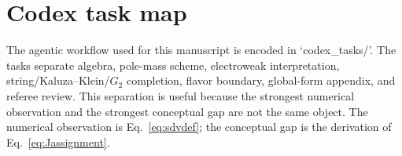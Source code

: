 \section{Codex task map}
\label{app:codex-map}

The agentic workflow used for this manuscript is encoded in `codex\_tasks/'.  The tasks separate algebra, pole-mass scheme, electroweak interpretation, string/Kaluza--Klein/\(G_2\) completion, flavor boundary, global-form appendix, and referee review.  This separation is useful because the strongest numerical observation and the strongest conceptual gap are not the same object.  The numerical observation is Eq.~\eqref{eq:sdvdef}; the conceptual gap is the derivation of Eq.~\eqref{eq:Jassignment}.
